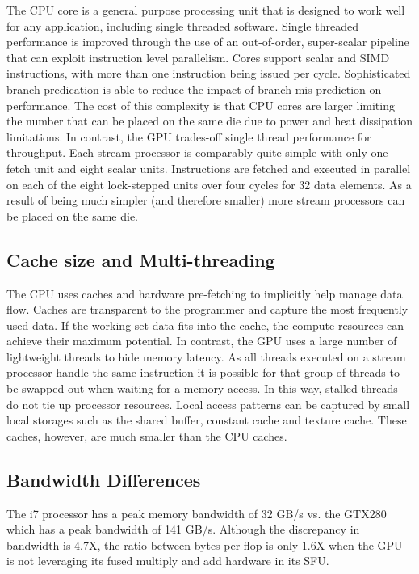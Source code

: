 \documentclass[conference]{IEEEtran}
\begin{document}
The CPU core is a general purpose processing unit that is designed to work well for any application, including single threaded software. Single threaded performance is improved through the use of an out-of-order, super-scalar pipeline that can exploit instruction level parallelism. Cores support scalar and SIMD instructions, with more than one instruction being issued per cycle. Sophisticated branch predication is able to reduce the impact of branch mis-prediction on performance. The cost of this complexity is that CPU cores are larger limiting the number that can be placed on the same die due to power and heat dissipation limitations. In contrast, the GPU trades-off single thread performance for throughput. Each stream processor is comparably quite simple with only one fetch unit and eight scalar units. Instructions are fetched and executed in parallel on each of the eight lock-stepped units over four cycles for 32 data elements. As a result of being much simpler (and therefore smaller) more stream processors can be placed on the same die.

\subsection{Cache size and Multi-threading}

The CPU uses caches and hardware pre-fetching to implicitly help manage data flow. Caches are transparent to the programmer and capture the most frequently used data. If the working set data fits into the cache, the compute resources can achieve their maximum potential. In contrast, the GPU uses a large number of lightweight threads to hide memory latency. As all threads executed on a stream processor handle the same instruction it is possible for that group of threads to be swapped out when waiting for a memory access. In this way, stalled threads do not tie up processor resources. Local access patterns can be captured by small local storages such as the shared buffer, constant cache and texture cache. These caches, however,  are much smaller than the CPU caches.

\subsection{Bandwidth Differences}

The i7 processor has a peak memory bandwidth of 32 GB/s vs. the GTX280 which has a peak bandwidth of 141 GB/s. Although the discrepancy in bandwidth is 4.7X, the ratio between bytes per flop is only 1.6X when the GPU is not leveraging its fused multiply and add hardware in its SFU.
\end{document}
